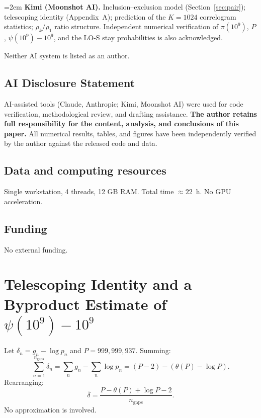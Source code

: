 \documentclass[11pt]{article}
\begin{document}
{\emergencystretch=2em
\textbf{Kimi (Moonshot AI).} Inclusion--exclusion model
(Section~\ref{sec:pair}); telescoping identity (Appendix~A); prediction
of the $K = 1024$ correlogram statistics; $\rho_k/\rho_1$ ratio
structure. Independent numerical verification of $\pi(10^9)$, $P$,
$\psi(10^9) - 10^9$, and the LO-S stay probabilities is also
acknowledged.\par}

Neither AI system is listed as an author.

\subsection{AI Disclosure Statement}
AI-assisted tools (Claude, Anthropic; Kimi, Moonshot AI) were used for
code verification, methodological review, and drafting assistance.
\textbf{The author retains full responsibility for the content,
analysis, and conclusions of this paper.} All numerical results,
tables, and figures have been independently verified by the author
against the released code and data.

\subsection{Data and computing resources}
Single workstation, 4 threads, 12 GB RAM. Total time $\approx 22$~h.
No GPU acceleration.

\subsection{Funding}
No external funding.

\appendix

\section{Telescoping Identity and a Byproduct Estimate of
$\psi(10^9) - 10^9$}

Let $\delta_n = g_n - \log p_n$ and $P = 999{,}999{,}937$. Summing:
\begin{equation}
\sum_{n=1}^{n_{\text{gaps}}} \delta_n
= \sum_n g_n - \sum_n \log p_n
= (P - 2) - (\theta(P) - \log P).
\end{equation}
Rearranging:
\begin{equation}
\bar\delta = \frac{P - \theta(P) + \log P - 2}{n_{\text{gaps}}}.
\label{eq:deltabar}
\end{equation}
No approximation is involved.
\end{document}

